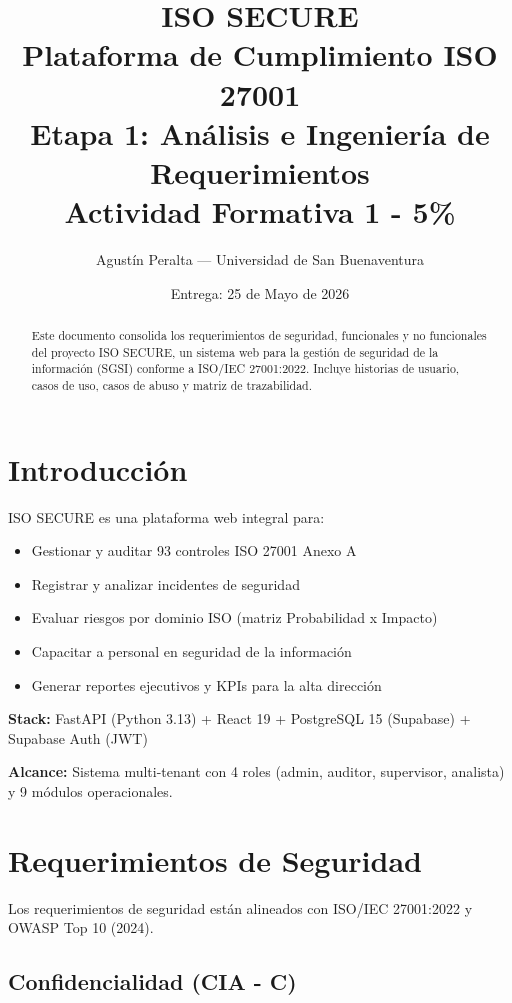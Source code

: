 \documentclass[12pt,a4paper,oneside]{article}
\title{
  {\Huge \textbf{ISO SECURE}}\\
  {\LARGE Plataforma de Cumplimiento ISO 27001}\\[2ex]
  {\Large \textcolor{accent}{Etapa 1: Análisis e Ingeniería de Requerimientos}}\\[1ex]
  {\small Actividad Formativa 1 - 5\%}
}
\author{Agustín Peralta --- Universidad de San Buenaventura}
\date{Entrega: 25 de Mayo de 2026}
\begin{document}
\maketitle

\begin{abstract}
Este documento consolida los requerimientos de seguridad, funcionales y no funcionales del proyecto ISO SECURE, un sistema web para la gestión de seguridad de la información (SGSI) conforme a ISO/IEC 27001:2022. Incluye historias de usuario, casos de uso, casos de abuso y matriz de trazabilidad.
\end{abstract}

\tableofcontents
\newpage

\section{Introducción}

ISO SECURE es una plataforma web integral para:
\begin{itemize}
  \item Gestionar y auditar 93 controles ISO 27001 Anexo A
  \item Registrar y analizar incidentes de seguridad
  \item Evaluar riesgos por dominio ISO (matriz Probabilidad x Impacto)
  \item Capacitar a personal en seguridad de la información
  \item Generar reportes ejecutivos y KPIs para la alta dirección
\end{itemize}

\textbf{Stack:} FastAPI (Python 3.13) + React 19 + PostgreSQL 15 (Supabase) + Supabase Auth (JWT)

\textbf{Alcance:} Sistema multi-tenant con 4 roles (admin, auditor, supervisor, analista) y 9 módulos operacionales.

\section{Requerimientos de Seguridad}

Los requerimientos de seguridad están alineados con ISO/IEC 27001:2022 y OWASP Top 10 (2024).

\subsection{Confidencialidad (CIA - C)}
\end{document}
